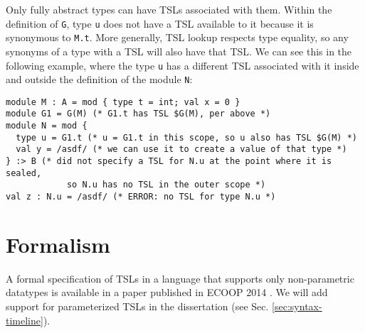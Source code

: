 Only fully abstract types can have TSLs associated with them. Within the definition of \lstinline{G}, type \lstinline{u} does not have a TSL available to it because it is synonymous to \lstinline{M.t}. More generally, TSL lookup respects type equality, so any synonyms of a type with a TSL will also have that TSL. We can see this in the following example, where the type \lstinline{u} has a different TSL associated with it inside and outside the definition of the module \lstinline{N}:
\begin{lstlisting}[numbers=none,mathescape=|]
module M : A = mod { type t = int; val x = 0 }
module G1 = G(M) (* G1.t has TSL $G(M), per above *)
module N = mod { 
  type u = G1.t (* u = G1.t in this scope, so u also has TSL $G(M) *)
  val y = /asdf/ (* we can use it to create a value of that type *) 
} :> B (* did not specify a TSL for N.u at the point where it is sealed, 
            so N.u has no TSL in the outer scope *)
val z : N.u = /asdf/ (* ERROR: no TSL for type N.u *)
\end{lstlisting}

\section{Formalism}
A formal specification of TSLs in a language that supports only non-parametric datatypes is available in a paper published in ECOOP 2014 \cite{TSLs}. We will add support for parameterized TSLs in the dissertation (see Sec. \ref{sec:syntax-timeline}).
